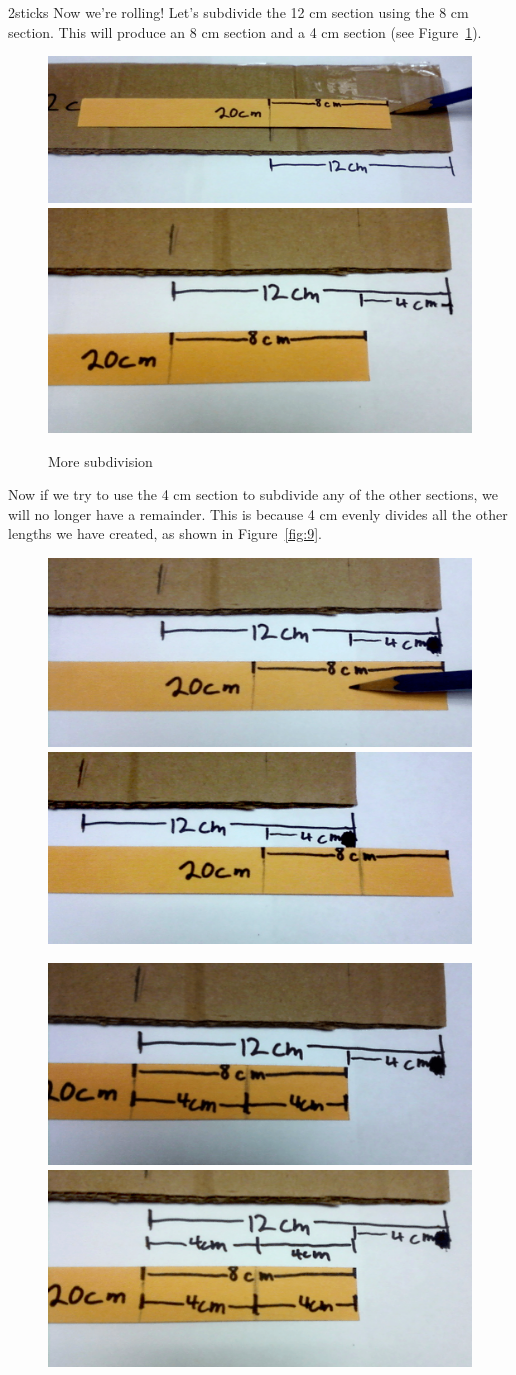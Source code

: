 \begin{example}{2sticks}
Now we're rolling! Let's subdivide the 12 cm section using the 8 cm section.  This will produce an 8 cm section and a 4 cm section (see Figure~\ref{fig:8}).
\begin{figure}
\begin{center}
	\includegraphics[width=.4900\textwidth]{images/2_sticks_step8.png} 
\includegraphics[width=.4900\textwidth]{images/2_sticks_step9.png}
\end{center}
\caption{More subdivision\label{fig:8}}
\end{figure}
Now if we try to use the 4 cm section to subdivide any of the other sections, we will no longer have a remainder.  This is because 4 cm evenly divides all the other lengths we have created, as shown in  Figure~\ref{fig:9}.
\begin{figure}
\begin{center}
	\includegraphics[width=.4900\textwidth]{images/2_sticks_step10.png} 
\includegraphics[width=.4900\textwidth]{images/2_sticks_step11.png}

	\includegraphics[width=.4900\textwidth]{images/2_sticks_step12.png} \includegraphics[width=.4900\textwidth]{images/2_sticks_step13.png}


\end{center}
\end{figure}
\end{example}

